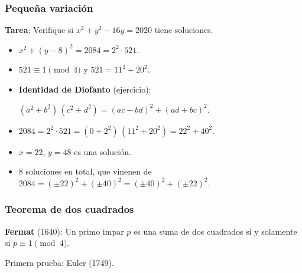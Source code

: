 \documentclass[handout]{beamer}
\begin{document}

\begin{frame}[fragile]
  \frametitle{Pequeña variación}

  \begin{shaded}
    \textbf{Tarea}: Verifique si $x^2 + y^2 - 16y = 2020$ tiene soluciones.
  \end{shaded}

  \vspace{1em}

  \ifdefined\solutions

  \begin{itemize}
  \item<3-> $x^2 + (y - 8)^2 = 2084 = 2^2 \cdot 521$.
 
  \item<4-> $521 \equiv 1 \pmod{4}$ y $521 = 11^2 + 20^2$.

  \item<5-> \textbf{Identidad de Diofanto} (ejercicio):

    $(a^2 + b^2)\,(c^2 + d^2) = (ac - bd)^2 + (ad + bc)^2$.

  \item<6-> $2084 = 2^2\cdot 521 = (0 + 2^2)\,(11^2 + 20^2) = 22^2 + 40^2$.

  \item<7-> $x = 22$, $y = 48$ es una solución.

  \item<8-> $8$ soluciones en total, que vinenen de $2084 = (\pm 22)^2 + (\pm 40)^2 = (\pm 40)^2 + (\pm 22)^2$.
\end{itemize}
\fi
\end{frame}


\begin{frame}[fragile]
  \frametitle{Teorema de dos cuadrados}

  \begin{shaded}
    \textbf{Fermat} (1640): Un primo impar $p$ es una suma de dos cuadrados si y
    solamente si $p \equiv 1 \pmod{4}$.

    Primera prueba: Euler (1749).
  \end{shaded}

\end{frame}
\end{document}
